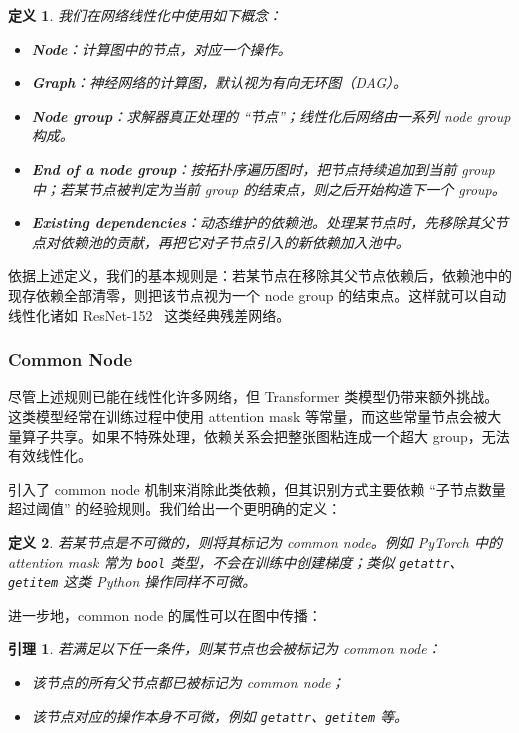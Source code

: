 \documentclass[10pt,letterpaper,twocolumn]{article}
\newtheorem{definition}{定义}
\newtheorem{lemma}{引理}
\begin{document}
\begin{definition}
我们在网络线性化中使用如下概念：
\begin{itemize}
    \item \textbf{Node}：计算图中的节点，对应一个操作。
    \item \textbf{Graph}：神经网络的计算图，默认视为有向无环图（DAG）。
    \item \textbf{Node group}：求解器真正处理的 ``节点''；线性化后网络由一系列 node group 构成。
    \item \textbf{End of a node group}：按拓扑序遍历图时，把节点持续追加到当前 group 中；若某节点被判定为当前 group 的结束点，则之后开始构造下一个 group。
    \item \textbf{Existing dependencies}：动态维护的依赖池。处理某节点时，先移除其父节点对依赖池的贡献，再把它对子节点引入的新依赖加入池中。
\end{itemize}
\end{definition}

依据上述定义，我们的基本规则是：若某节点在移除其父节点依赖后，依赖池中的现存依赖全部清零，则把该节点视为一个 node group 的结束点。这样就可以自动线性化诸如 ResNet-152~\cite{he2016deep} 这类经典残差网络。

\subsubsection{Common Node}

尽管上述规则已能在线性化许多网络，但 Transformer 类模型仍带来额外挑战。这类模型经常在训练过程中使用 attention mask 等常量，而这些常量节点会被大量算子共享。如果不特殊处理，依赖关系会把整张图粘连成一个超大 group，无法有效线性化。

\cite{lai2022merak} 引入了 common node 机制来消除此类依赖，但其识别方式主要依赖 ``子节点数量超过阈值'' 的经验规则。我们给出一个更明确的定义：

\begin{definition}
若某节点是不可微的，则将其标记为 common node。例如 PyTorch 中的 attention mask 常为 \texttt{bool} 类型，不会在训练中创建梯度；类似 \texttt{getattr}、\texttt{getitem} 这类 Python 操作同样不可微。
\label{def: common-node}
\end{definition}

进一步地，common node 的属性可以在图中传播：

\begin{lemma}
若满足以下任一条件，则某节点也会被标记为 common node：
\begin{itemize}
    \item 该节点的所有父节点都已被标记为 common node；
    \item 该节点对应的操作本身不可微，例如 \texttt{getattr}、\texttt{getitem} 等。
\end{itemize}
\label{lem:cnodeprop}
\end{lemma}
\end{document}
